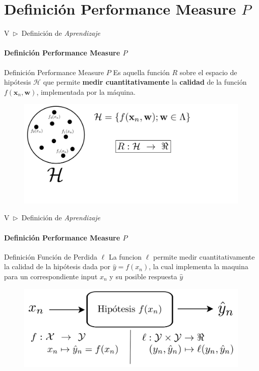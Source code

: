 \documentclass[xcolor=dvipsnames]{beamer}
\begin{document}
    \section{Definición Performance Measure \( P \)}
    \begin{frame}{V~$\rhd$~Definición de \textit{Aprendizaje}}
    \framesubtitle{Definición Performance Measure \( P \)}
        \begin{block}{Definición Performance Measure \( P \)}
        Es aquella función $R$ sobre el espacio de hipótesis $\mathcal{H}$ que permite \textbf{medir cuantitativamente} la \textbf{calidad} de la función $f(\mathbf{x}_{n}, \mathbf{w})$, implementada por la máquina.
        \end{block}
        \vspace{3mm}
        \begin{figure}
            \centering
            \includegraphics[width=0.8\linewidth]{imgs/def03/measure02.png}
        \end{figure}
    \end{frame}

    \begin{frame}{V~$\rhd$~Definición de \textit{Aprendizaje}}
    \framesubtitle{Definición Performance Measure \( P \)}
        \begin{block}{Definición Función de Perdida $\ell$}
        La funcion $\ell$ permite medir cuantitativamente la calidad de la hipótesis dada por $\hat{y}=f(x_{n})$, la cual implementa la maquina para un correspondiente input $x_{n}$ y su posible respuesta $\hat{y}$ 
        \end{block}
        \vspace{3mm}
        \begin{figure}
            \centering
            \includegraphics[width=0.8\linewidth]{imgs/def03/measure03.png}
        \end{figure}
    \end{frame}
\end{document}
